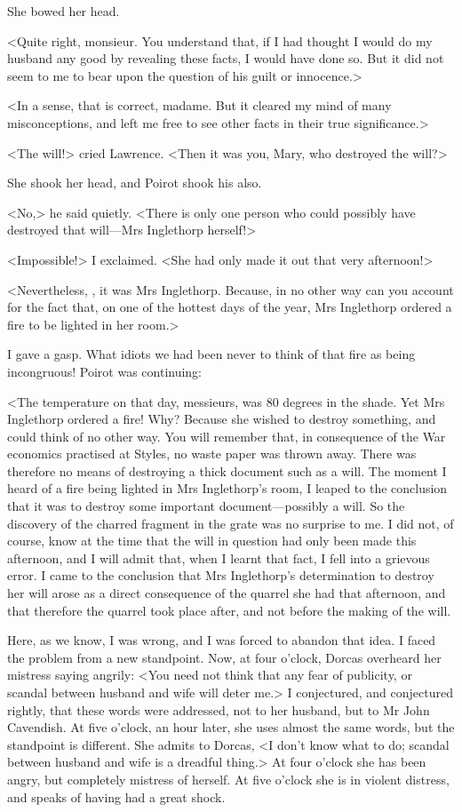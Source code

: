  She bowed her head. 

 <Quite right, monsieur. You understand that, if I had thought I would do my husband any good by revealing these facts, I would have done so. But it did not seem to me to bear upon the question of his guilt or innocence.> 

 <In a sense, that is correct, madame. But it cleared my mind of many misconceptions, and left me free to see other facts in their true significance.> 

 <The will!> cried Lawrence. <Then it was you, Mary, who destroyed the will?> 

 She shook her head, and Poirot shook his also. 

 <No,> he said quietly. <There is only one person who could possibly have destroyed that will—Mrs Inglethorp herself!> 

 <Impossible!> I exclaimed. <She had only made it out that very afternoon!> 

 <Nevertheless, , it was Mrs Inglethorp. Because, in no other way can you account for the fact that, on one of the hottest days of the year, Mrs Inglethorp ordered a fire to be lighted in her room.> 

 I gave a gasp. What idiots we had been never to think of that fire as being incongruous! Poirot was continuing: 

 <The temperature on that day, messieurs, was 80 degrees in the shade. Yet Mrs Inglethorp ordered a fire! Why? Because she wished to destroy something, and could think of no other way. You will remember that, in consequence of the War economics practised at Styles, no waste paper was thrown away. There was therefore no means of destroying a thick document such as a will. The moment I heard of a fire being lighted in Mrs Inglethorp's room, I leaped to the conclusion that it was to destroy some important document—possibly a will. So the discovery of the charred fragment in the grate was no surprise to me. I did not, of course, know at the time that the will in question had only been made this afternoon, and I will admit that, when I learnt that fact, I fell into a grievous error. I came to the conclusion that Mrs Inglethorp's determination to destroy her will arose as a direct consequence of the quarrel she had that afternoon, and that therefore the quarrel took place after, and not before the making of the will. 

 Here, as we know, I was wrong, and I was forced to abandon that idea. I faced the problem from a new standpoint. Now, at four o'clock, Dorcas overheard her mistress saying angrily: <You need not think that any fear of publicity, or scandal between husband and wife will deter me.> I conjectured, and conjectured rightly, that these words were addressed, not to her husband, but to Mr John Cavendish. At five o'clock, an hour later, she uses almost the same words, but the standpoint is different. She admits to Dorcas, <I don't know what to do; scandal between husband and wife is a dreadful thing.> At four o'clock she has been angry, but completely mistress of herself. At five o'clock she is in violent distress, and speaks of having had a great shock. 

